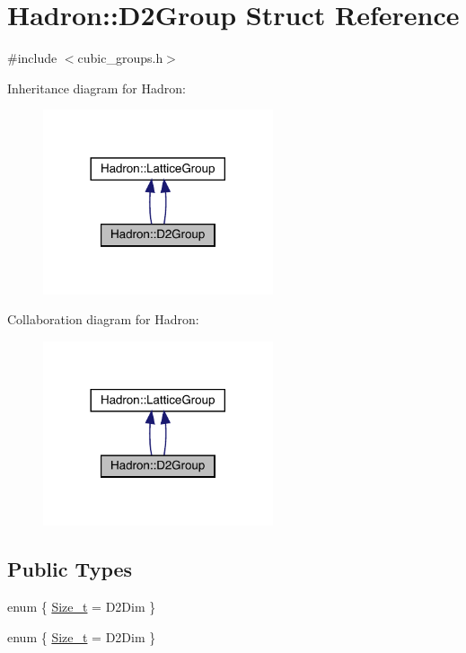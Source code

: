 \hypertarget{structHadron_1_1D2Group}{}\section{Hadron\+:\+:D2\+Group Struct Reference}
\label{structHadron_1_1D2Group}


{\ttfamily \#include $<$cubic\+\_\+groups.\+h$>$}



Inheritance diagram for Hadron\+:\nopagebreak
\begin{figure}[H]
\begin{center}
\leavevmode
\includegraphics[width=192pt]{d6/df0/structHadron_1_1D2Group__inherit__graph}
\end{center}
\end{figure}


Collaboration diagram for Hadron\+:\nopagebreak
\begin{figure}[H]
\begin{center}
\leavevmode
\includegraphics[width=192pt]{d8/d62/structHadron_1_1D2Group__coll__graph}
\end{center}
\end{figure}
\subsection*{Public Types}
\begin{DoxyCompactItemize}
\item 
enum \{ \mbox{\hyperlink{structHadron_1_1D2Group_a5344571eca366ff7d4735166b2c37230ac83117b5f0225cc78e299acc4b82da56}{Size\+\_\+t}} = D2\+Dim
 \}
\item 
enum \{ \mbox{\hyperlink{structHadron_1_1D2Group_a5344571eca366ff7d4735166b2c37230ac83117b5f0225cc78e299acc4b82da56}{Size\+\_\+t}} = D2\+Dim
 \}
\end{DoxyCompactItemize}
